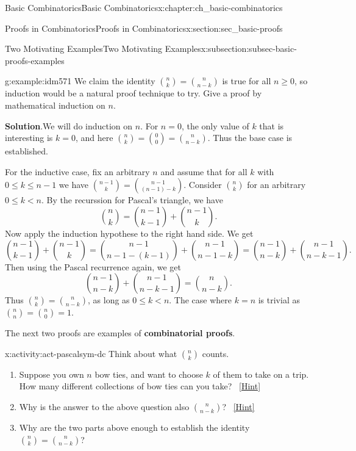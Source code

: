 \documentclass[oneside,10pt,]{book}
\newcommand{\terminology}[1]{\textbf{#1}}
\numberwithin{equation}{chapter}
\newcommand{\lt}{<}
\begin{document}
\begin{chapterptx}{Basic Combinatorics}{}{Basic Combinatorics}{}{}{x:chapter:ch_basic-combinatorics}
\begin{sectionptx}{Proofs in Combinatorics}{}{Proofs in Combinatorics}{}{}{x:section:sec_basic-proofs}
\begin{subsectionptx}{Two Motivating Examples}{}{Two Motivating Examples}{}{}{x:subsection:subsec-basic-proofs-examples}
\begin{example}{}{g:example:idm571}%
We claim the identity \(\binom{n}{k} = \binom{n}{n-k}\) is true for all \(n \ge 0\), so induction would be a natural proof technique to try.  Give a proof by mathematical induction on \(n\).%
\par\smallskip%
\noindent\textbf{Solution}.\hypertarget{g:solution:idm577}{}\quad{}We will do induction on \(n\).  For \(n = 0\), the only value of \(k\) that is interesting is \(k=0\), and here \(\binom{n}{k} = \binom{0}{0} = \binom{n}{n-k}\).  Thus the base case is established.%
\par
For the inductive case, fix an arbitrary \(n\) and assume that for all \(k\) with \(0 \le k \le n-1\) we have \(\binom{n-1}{k} = \binom{n-1}{(n-1)-k}\).  Consider \(\binom{n}{k}\) for an arbitrary \(0 \le k \lt n\).  By the recurssion for Pascal's triangle, we have%
\begin{equation*}
\binom{n}{k} = \binom{n-1}{k-1} + \binom{n-1}{k}.
\end{equation*}
Now apply the induction hypothese to the right hand side.  We get%
\begin{equation*}
\binom{n-1}{k-1} + \binom{n-1}{k} = \binom{n-1}{n-1-(k-1)} + \binom{n-1}{n-1 -k} = \binom{n-1}{n-k} + \binom{n-1}{n-k-1}.
\end{equation*}
Then using the Pascal recurrence again, we get%
\begin{equation*}
\binom{n-1}{n-k} + \binom{n-1}{n-k-1} = \binom{n}{n-k}.
\end{equation*}
Thus \(\binom{n}{k} = \binom{n}{n-k}\), as long as \(0 \le k \lt n\).  The case where \(k = n\) is trivial as \(\binom{n}{n} = \binom{n}{0} = 1\).%
\end{example}
The next two proofs are examples of \terminology{combinatorial proofs}.%
\begin{activity}{}{x:activity:act-pascalsym-dc}%
Think about what \(\binom{n}{k}\) counts.%
\begin{enumerate}[font=\bfseries,label=(\alph*),ref=\alph*]
\item{}Suppose you own \(n\) bow ties, and want to choose \(k\) of them to take on a trip.  How many different collections of bow ties can you take?%
\qquad~\hfill{\tiny\hyperlink{g:hint:idm609-back}{[Hint]}}\item{}Why is the answer to the above question also \(\binom{n}{n-k}\)?%
\qquad~\hfill{\tiny\hyperlink{g:hint:idm620-back}{[Hint]}}\item{}Why are the two parts above enough to establish the identity \(\binom{n}{k} = \binom{n}{n-k}\)?%

\end{enumerate}
\end{activity}
\end{subsectionptx}
\end{sectionptx}
\end{chapterptx}
\end{document}
